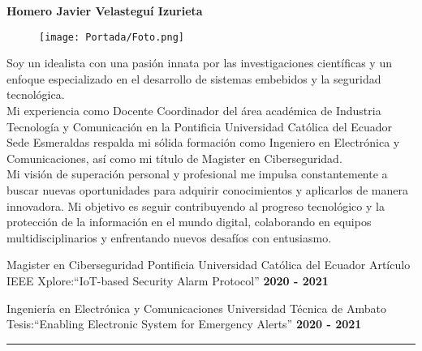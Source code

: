 \begin{mainbar}
    \textbf{Homero Javier Velasteguí Izurieta}
\end{mainbar}

\setlength{\columnsep}{0.75cm}
\setlength{\columnseprule}{3pt}



\begin{paracol}{2}
\begin{leftcolumn}


\begin{wrapfigure}{l}{0.18\textwidth}
  \begin{center}
    \texttt{[image: Portada/Foto.png]}  
  \end{center}
\end{wrapfigure}
Soy un idealista con una pasión innata por las investigaciones científicas y un enfoque especializado en el desarrollo de sistemas embebidos y la seguridad tecnológica.\\ Mi experiencia como Docente Coordinador del área académica de Industria Tecnología y Comunicación en la Pontificia Universidad Católica del Ecuador Sede Esmeraldas respalda mi sólida formación como Ingeniero en Electrónica y Comunicaciones, así como mi título de Magister en Ciberseguridad.\\
Mi visión de superación personal y profesional me impulsa constantemente a buscar nuevas oportunidades para adquirir conocimientos y aplicarlos de manera innovadora. Mi objetivo es seguir contribuyendo al progreso tecnológico y la protección de la información en el mundo digital, colaborando en equipos multidisciplinarios y enfrentando nuevos desafíos con entusiasmo.

\end{leftcolumn}

\begin{rightcolumn} 




\begin{dport}
    \pvevent
	{Magister en Ciberseguridad}
	{Pontificia Universidad Católica del Ecuador }
	{Artículo IEEE Xplore:“IoT-based Security Alarm Protocol”}
	{}
	{\textbf{2020 - 2021}}
\end{dport}


\begin{lport}
    \pvevent
	{Ingeniería en Electrónica y Comunicaciones}
	{Universidad Técnica de Ambato }
	{Tesis:“Enabling Electronic System for Emergency Alerts”}
	{}
	{\textbf{2020 - 2021}}
\end{lport}

\end{rightcolumn}
\end{paracol}
\setlength{\parindent}{0pt}
\textcolor{lightcol}{ \rule{1.02\textwidth}{3pt} }

